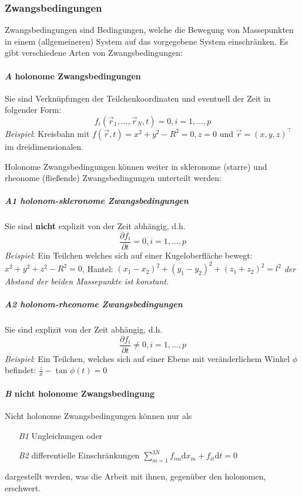 \documentclass[oneside]{book}
\theoremstyle{definition}
\renewcommand{\d}{\mathrm d}
\begin{document}
\subsubsection{Zwangsbedingungen} 
Zwangsbedingungen sind Bedingungen, welche die Bewegung von Massepunkten in einem (allgemeineren) System auf das vorgegebene System einschränken. Es gibt verschiedene Arten von Zwangsbedingungen:

\paragraph{\textit{A} holonome Zwangsbedingungen} Sie sind Verknüpfungen der Teilchenkoordinaten und eventuell der
Zeit in folgender Form: $$f_i(\vec{r}_1, \dots, \vec{r}_N, t) = 0, i = 1, \dots, p$$ 
\emph{Beispiel}: Kreisbahn mit $f(\vec{r}, t) = x^2 + y^2 - R^2 = 0, z = 0$ und $\vec{r} = (x,y,z)^\top$ im dreidimensionalen.

Holonome Zwangsbedingungen können weiter in skleronome (starre) und rheonome (fließende) Zwangsbedingungen unterteilt werden:

\subparagraph{\textit{A1} holonom-skleronome Zwangsbedingungen} Sie sind \textbf{nicht} explizit von der Zeit abhängig, d.h.
$$ \frac{\partial f_i}{\partial t} = 0, i = 1, \dots, p$$
\emph{Beispiel}: Ein Teilchen welches sich auf einer Kugeloberfläche bewegt: $x^2 + y^2 + z^2 - R^2 = 0$, Hantel: $(x_1 - x_2)^2 + (y_1 - y_2)^2 + (z_1 + z_2)^2 = l^2$ \textit{der Abstand der beiden Massepunkte ist konstant.}

\subparagraph{\textit{A2} holonom-rheonome Zwangsbedingungen} Sie sind explizit von der Zeit abhängig, d.h.
$$ \frac{\partial f_i}{\partial t} \neq 0, i = 1, \dots, p$$
\emph{Beispiel}: Ein Teilchen, welches sich auf einer Ebene mit veränderlichem Winkel $\phi$ befindet: $\frac{z}{x} - \tan{\phi(t)} = 0$


\paragraph{\textit{B} nicht holonome Zwangsbedingung}
Nicht holonome Zwangsbedingungen können nur als 
\begin{itemize}
	\item[\textit{B1}] Ungleichungen oder
	\item[\textit{B2}] differentielle Einschränkungen
	$ \sum_{m = 1}^{3N} f_{im} \d x_m + f_{it} \d t = 0$
\end{itemize}
dargestellt werden, was die Arbeit mit ihnen, gegenüber den holonomen, erschwert. 
\end{document}
